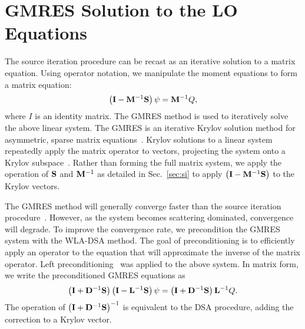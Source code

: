 \section{GMRES Solution to the LO Equations}

The source iteration procedure can be recast as an iterative solution to a matrix
equation. Using operator notation, we manipulate
the moment equations to form a matrix equation:
\begin{equation}
    \left(\mathbf{I}  - \mathbf{M}^{-1}\mathbf{S}\right) \psi = \mathbf{M}^{-1} Q,
\end{equation}
where $I$ is an identity matrix.  The GMRES method is used to iteratively solve the above
linear system. The GMRES is an iterative Krylov solution method for asymmetric, sparse matrix
equations~\cite{saad}.   Krylov solutions to a linear system repeatedly apply the
matrix operator to vectors, projecting the system onto a Krylov
subspace~\cite{saad}.  Rather than forming the full matrix system, we apply the
operation of $\mathbf{S}$ and $\mathbf{M}^{-1}$ as detailed in Sec.~\eqref{sec:si} to apply $\left(\mathbf{I}  - \mathbf{M}^{-1}\mathbf{S}\right)$ to the Krylov vectors. 

The GMRES method will generally converge faster than the source iteration
procedure~\cite{morel_dsa}.  However, as the system becomes scattering dominated,
convergence will degrade.  To improve the convergence rate, we precondition the GMRES
system with the WLA-DSA method.  The goal of preconditioning is to efficiently apply an
operator to the equation that will approximate the inverse of the matrix operator. Left
preconditioning~\cite{saad} was applied to the above system.  In matrix form, we write the preconditioned GMRES equations as
\begin{equation}
    \left(\mathbf{I} + \mathbf{D}^{-1} \mathbf{S}\right)\left(\mathbf{I} - \mathbf{L}^{-1} \mathbf{S} \right) \psi = \left( \mathbf{I} + \mathbf{D}^{-1}\mathbf{S}\right) \mathbf{L}^{-1} Q.
\end{equation}
The operation of $\left(\mathbf{I} + \mathbf{D}^{-1} \mathbf{S}\right)^{-1}$ is equivalent to the DSA
procedure, adding the correction to a Krylov vector.

